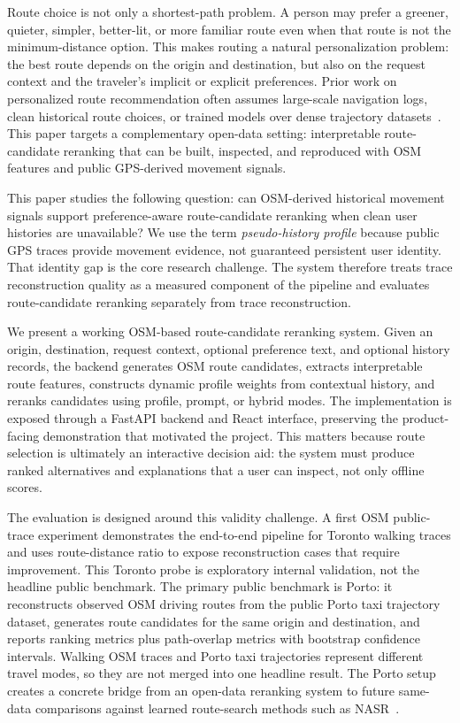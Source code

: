 Route choice is not only a shortest-path problem. A person may prefer a greener, quieter, simpler, better-lit, or more familiar route even when that route is not the minimum-distance option. This makes routing a natural personalization problem: the best route depends on the origin and destination, but also on the request context and the traveler's implicit or explicit preferences. Prior work on personalized route recommendation often assumes large-scale navigation logs, clean historical route choices, or trained models over dense trajectory datasets~\cite{dai2015bigtrajectory, nasr2019, userhabits2024}. This paper targets a complementary open-data setting: interpretable route-candidate reranking that can be built, inspected, and reproduced with OSM features and public GPS-derived movement signals.

This paper studies the following question: can OSM-derived historical movement signals support preference-aware route-candidate reranking when clean user histories are unavailable? We use the term \emph{pseudo-history profile} because public GPS traces provide movement evidence, not guaranteed persistent user identity. That identity gap is the core research challenge. The system therefore treats trace reconstruction quality as a measured component of the pipeline and evaluates route-candidate reranking separately from trace reconstruction.

We present a working OSM-based route-candidate reranking system. Given an origin, destination, request context, optional preference text, and optional history records, the backend generates OSM route candidates, extracts interpretable route features, constructs dynamic profile weights from contextual history, and reranks candidates using profile, prompt, or hybrid modes. The implementation is exposed through a FastAPI backend and React interface, preserving the product-facing demonstration that motivated the project. This matters because route selection is ultimately an interactive decision aid: the system must produce ranked alternatives and explanations that a user can inspect, not only offline scores.

The evaluation is designed around this validity challenge. A first OSM public-trace experiment demonstrates the end-to-end pipeline for Toronto walking traces and uses route-distance ratio to expose reconstruction cases that require improvement. This Toronto probe is exploratory internal validation, not the headline public benchmark. The primary public benchmark is Porto: it reconstructs observed OSM driving routes from the public Porto taxi trajectory dataset, generates route candidates for the same origin and destination, and reports ranking metrics plus path-overlap metrics with bootstrap confidence intervals. Walking OSM traces and Porto taxi trajectories represent different travel modes, so they are not merged into one headline result. The Porto setup creates a concrete bridge from an open-data reranking system to future same-data comparisons against learned route-search methods such as NASR~\cite{nasr2019}.

